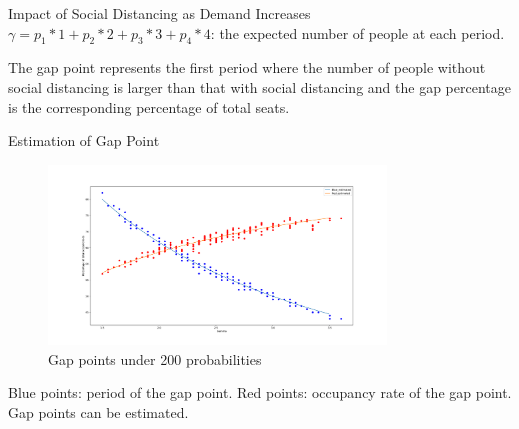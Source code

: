     \begin{frame}{Impact of Social Distancing as Demand Increases}
        \scriptsize
        $\gamma = p_1 * 1 + p_2 * 2 + p_3 * 3 + p_4 * 4$: the expected number of people at each period.
        \begin{figure}[h]
            \centering
          \end{figure}
        \scriptsize
        The gap point represents the first period where the number of people without social distancing is larger than that with social distancing and the gap percentage is the corresponding percentage of total seats.
    \end{frame}
      
    \begin{frame}{Estimation of Gap Point}
      \begin{figure}[ht]
        \centering
        \includegraphics[width = 0.8\textwidth]{./images/gamma_estimation.pdf}
        \caption{Gap points under 200 probabilities}
    \end{figure}
    \scriptsize
    {\color{blue} Blue points}: period of the gap point.
    {\color{red} Red points}: occupancy rate of the gap point. 
    Gap points can be estimated.
    \end{frame}

